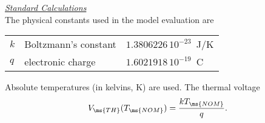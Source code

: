 \noindent\underline{\sl \large Standard Calculations}\\[0.1in]
The physical constants used in the model evaluation are
\begin{center}
\begin{tabular}{|l|l|l|}
\hline
$k$ & Boltzmann's constant           &  $1.3806226\,10^{-23}$~J/K\\
$q$ & electronic charge             & $1.6021918\,10^{-19}$~C\\
\hline
\end{tabular}
\end{center}
Absolute temperatures (in kelvins, K) are used. The thermal
voltage
\begin{equation}
V_{\ms{TH}}(T_{\ms{NOM}}) = {{kT_{\ms{NOM}}} \over q} .
\end{equation}

